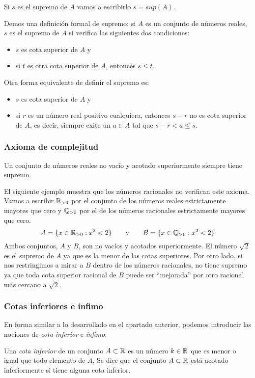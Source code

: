 \documentclass[../teoria.root.tex]{subfiles}
\begin{document}
Si \(s\) es el supremo de \(A\) vamos a escribirlo \(s = sup(A)\).

Demos una definición formal de supremo:
si \(A\) es un conjunto de números reales, \(s\) es el supremo de \(A\) si verifica las siguientes dos condiciones:
\begin{itemize}
	\item \(s\) es cota superior de \(A\) y
	\item si \(t\) es otra cota superior de \(A\), entonces \(s \leq t\).
\end{itemize}
Otra forma equivalente de definir el supremo es:
\begin{itemize}
	\item \(s\) es cota superior de \(A\) y
	\item si \(r\) es un número real positivo cualquiera, entonces \(s - r\) no es cota superior de \(A\), es decir, siempre exite un \(a \in A\) tal que \(s - r < a \leq s\).
\end{itemize}
\subsubsection{Axioma de complejitud}
Un conjunto de números reales no vacío y acotado superiormente siempre tiene supremo.

El siguiente ejemplo muestra que los números racionales no verifican este axioma.
Vamos a escribir \(\mathbb{R}_{>0}\) por el conjunto de los números reales estrictamente mayores que cero y \(\mathbb{Q}_{>0}\) por el de los números racionales estrictamente mayores que cero.
\[A = \{x \in \mathbb{R}_{>0} : x^2 < 2\}\qquad\text{y}\qquad B = \{x \in \mathbb{Q}_{>0} : x^2 < 2\}\]
Ambos conjuntos, \(A\) y \(B\), son no vacíos y acotados superiormente.
El número \(\sqrt{2}\) es el supremo de \(A\) ya que es la menor de las cotas superiores.
Por otro lado, si nos restringimos a mirar a \(B\) dentro de los números racionales, no tiene supremo ya que toda cota superior racional de \(B\) puede ser “mejorada” por otro racional más cercano a \(\sqrt{2}\).
\subsubsection{Cotas inferiores e ínfimo}
En forma similar a lo desarrollado en el apartado anterior, podemos introducir las nociones de \textit{cota inferior} e \textit{ínfimo}.

Una \textit{cota inferior} de un conjunto \(A \subset \mathbb{R}\) es un número \(k \in \mathbb{R}\) que es menor o igual que todo elemento de \(A\).
Se dice que el conjunto \(A \subset \mathbb{R}\) está acotado inferiormente si tiene alguna cota inferior.
\end{document}
